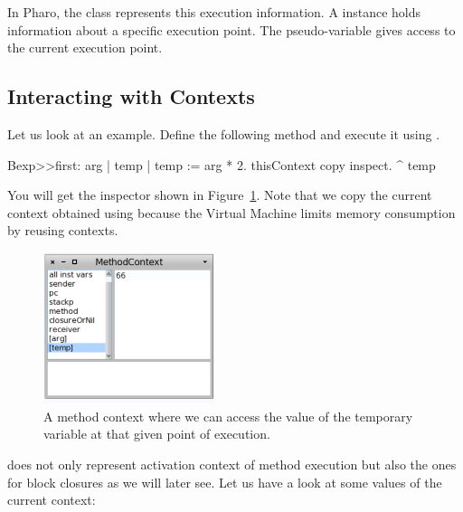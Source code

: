 \documentclass[a4paper,10pt,twoside]{book}
\begin{document}
In Pharo, the class  represents this execution information. A  instance holds information about a specific execution point.  The pseudo-variable  gives access to the current execution point.

\subsection{Interacting with Contexts}

Let us look at an example. Define the following method and execute it using .

\begin{code}{}
Bexp>>first: arg
	| temp |
	temp := arg * 2.
	thisContext copy inspect.
	^ temp
\end{code}

You will get the inspector shown in Figure~\ref{oneContext}. Note that we copy the current context obtained using  because the Virtual Machine limits memory consumption by reusing contexts.

\begin{figure}
\begin{center}\includegraphics[width=5cm]{OneContext}
\caption{A method context where we can access the value of the temporary variable  at that given point of execution.\label{oneContext}}
\end{center}
\end{figure}

 does not only represent activation context of method execution but also
the ones for block closures as we will later see. Let us have a look at some values of the current context:
\end{document}
